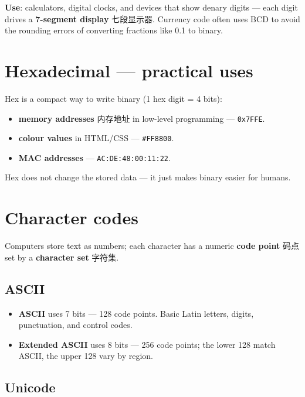 \documentclass[11pt]{article}
\begin{document}
\textbf{Use}: calculators, digital clocks, and devices that show denary digits — each digit drives a \textbf{7-segment display} 七段显示器. Currency code often uses BCD to avoid the rounding errors of converting fractions like 0.1 to binary.

\section*{Hexadecimal — practical uses}

Hex is a compact way to write binary (1 hex digit = 4 bits):

\begin{itemize}
\item \textbf{memory addresses} 内存地址 in low-level programming — \texttt{0x7FFE}.

\item \textbf{colour values} in HTML/CSS — \texttt{\#FF8800}.

\item \textbf{MAC addresses} — \texttt{AC:DE:48:00:11:22}.

\end{itemize}

Hex does not change the stored data — it just makes binary easier for humans.

\section*{Character codes}

Computers store text as numbers; each character has a numeric \textbf{code point} 码点 set by a \textbf{character set} 字符集.

\subsection*{ASCII}

\begin{itemize}
\item \textbf{ASCII} uses 7 bits — 128 code points. Basic Latin letters, digits, punctuation, and control codes.

\item \textbf{Extended ASCII} uses 8 bits — 256 code points; the lower 128 match ASCII, the upper 128 vary by region.

\end{itemize}

\subsection*{Unicode}
\end{document}
